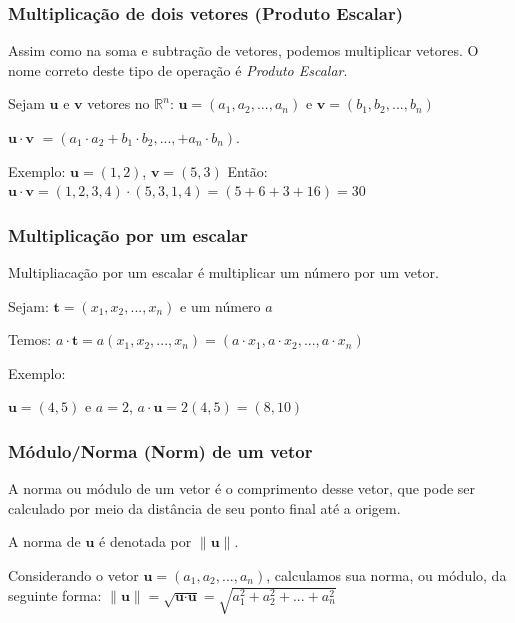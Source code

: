 \documentclass[12pt]{article}
\begin{document}
\subsubsection{Multiplicação de dois vetores (Produto Escalar)}

Assim como na soma e subtração de vetores, podemos multiplicar vetores. O nome correto deste tipo de operação é \textit{Produto Escalar}.

Sejam \(\textbf{u}\) e \(\textbf{v}\) vetores no \(\mathbb{R}^n\): \(\textbf{u}=(a_{1}, a_{2},...,a_{n})\) e \(\textbf{v}=(b_{1}, b_{2},...,b_{n})\)

\(\textbf{u} \cdot \textbf{v }= (a_{1} \cdot a_{2} + b_{1} \cdot b_{2} ,..., + a_{n} \cdot b_{n})\).

Exemplo: \(\textbf{u} = (1,2)\), \(\textbf{v} = (5, 3)\)
Então: \(\textbf{u} \cdot \textbf{v} = (1, 2, 3, 4) \cdot (5, 3, 1, 4) = (5 + 6 + 3 + 16) = 30\)

\subsubsection{Multiplicação por um escalar}

Multipliacação por um escalar é multiplicar um número por um vetor.

Sejam: \(\textbf{t} = (x_{1}, x_{2}, ..., x_{n})\) e um número \(\textit{a}\)

Temos: \(\textit{a}\cdot\textbf{t} = \textit{a}(x_{1}, x_{2}, ..., x_{n}) = (\textit{a} \cdot x_{1}, \textit{a} \cdot x_{2}, ..., \textit{a} \cdot x_{n})\)

Exemplo:

\(\textbf{u} = (4, 5)\) e \(\textit{a} = 2\), \(\textit{a}\cdot\textbf{u} = 2(4, 5) = (8, 10)\)

\subsubsection{Módulo/Norma (Norm) de um vetor}

A norma ou módulo de um vetor é o comprimento desse vetor, que pode ser calculado por meio da distância de seu ponto final até a origem.

A norma de \( \textbf{u} \) é denotada por \( \| \textbf{u} \| \).

Considerando o vetor \(\textbf{u} = (a_{1}, a_{2}, ..., a_{n})\), calculamos sua norma, ou módulo, da seguinte forma\cite{lipschutz-algebra, anton2012algebra}: \( \|\textbf{u}\| = \sqrt{\textbf{u} \cdot \textbf{u}} = \sqrt{a_{1}^2 + a_{2}^2 + ... + a_{n}^2} \) 
\end{document}
